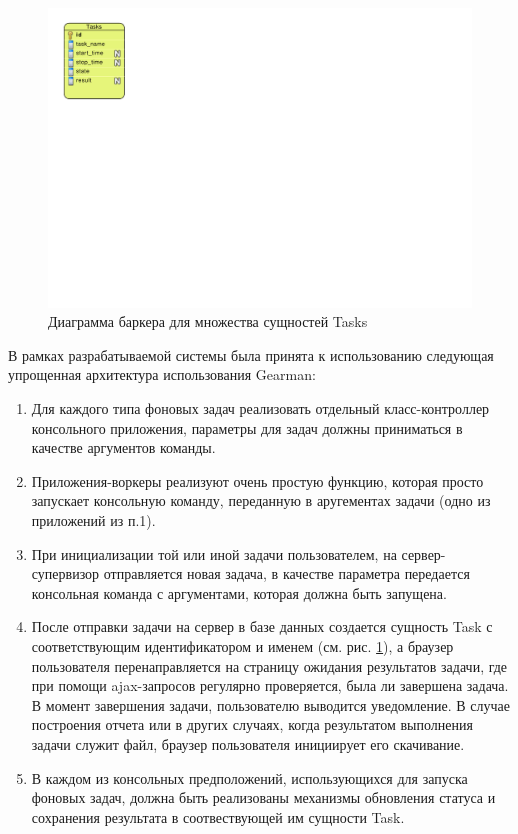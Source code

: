 \begin{figure}[!ht]
\begin{center}
\vspace{-0.5cm}
\hspace{20cm}
\includegraphics[scale=0.9, trim=10mm 143mm 240mm 10mm, clip]{../resources/uml/Tasks_db.pdf}
\caption{Диаграмма баркера для множества сущностей Tasks}
\label{gr:tasks_db}
\end{center}
\end{figure} 

В рамках разрабатываемой системы была принята к использованию следующая упрощенная архитектура использования
Gearman:
\begin{enumerate}
\item{
  Для каждого типа фоновых задач реализовать отдельный класс-контроллер консольного приложения, параметры 
  для задач должны приниматься в качестве аргументов команды.
}
\item{
  Приложения-воркеры реализуют очень простую функцию, которая просто запускает консольную команду,
   переданную в аругементах задачи (одно из приложений из п.1).
}
\item{
  При инициализации той или иной задачи пользователем, на сервер-супервизор отправляется новая задача,
  в качестве параметра передается консольная команда с аргументами, которая должна быть запущена.
}
\item{
  После отправки задачи на сервер в базе данных создается сущность Task с соответствующим идентификатором
  и именем (см. рис. \ref{gr:tasks_db}), а браузер пользователя перенаправляется на страницу
  ожидания результатов задачи, где при помощи ajax-запросов регулярно проверяется, была ли завершена задача.
  В момент завершения задачи, пользователю выводится уведомление. В случае построения отчета или в других
  случаях, когда результатом выполнения задачи служит файл, браузер пользователя инициирует его скачивание.
}
\item{
  В каждом из консольных предположений, использующихся для запуска фоновых задач, должна быть реализованы
  механизмы обновления статуса и сохранения результата в соотвествующей им сущности Task.
}
\end{enumerate}

